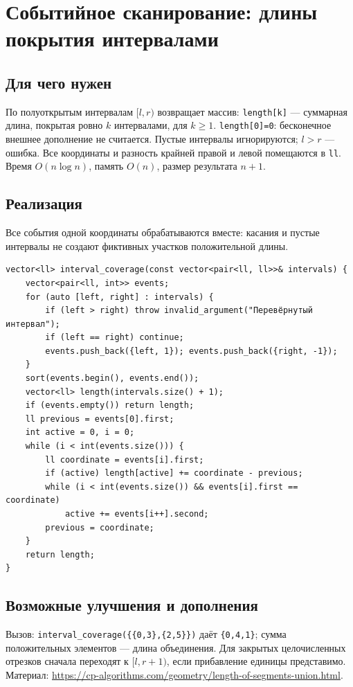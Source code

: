 \clearpage

\fi
\iffalse
\section{Событийное сканирование: длины покрытия интервалами}
\subsection*{Для чего нужен}
По полуоткрытым интервалам $[l,r)$ возвращает массив:
\texttt{length[k]} --- суммарная длина, покрытая ровно $k$ интервалами,
для $k\ge1$. \texttt{length[0]=0}: бесконечное внешнее дополнение не считается.
Пустые интервалы игнорируются; $l>r$ --- ошибка.
Все координаты и разность крайней правой и левой помещаются в \texttt{ll}.
Время $O(n\log n)$, память $O(n)$, размер результата $n+1$.
\subsection*{Реализация}
Все события одной координаты обрабатываются вместе: касания и пустые
интервалы не создают фиктивных участков положительной длины.
\begin{lstlisting}[name=supplement_sweep]
vector<ll> interval_coverage(const vector<pair<ll, ll>>& intervals) {
    vector<pair<ll, int>> events;
    for (auto [left, right] : intervals) {
        if (left > right) throw invalid_argument("Перевёрнутый интервал");
        if (left == right) continue;
        events.push_back({left, 1}); events.push_back({right, -1});
    }
    sort(events.begin(), events.end());
    vector<ll> length(intervals.size() + 1);
    if (events.empty()) return length;
    ll previous = events[0].first;
    int active = 0, i = 0;
    while (i < int(events.size())) {
        ll coordinate = events[i].first;
        if (active) length[active] += coordinate - previous;
        while (i < int(events.size()) && events[i].first == coordinate)
            active += events[i++].second;
        previous = coordinate;
    }
    return length;
}
\end{lstlisting}
\subsection*{Возможные улучшения и дополнения}
Вызов: \texttt{interval\_coverage(\{\{0,3\},\{2,5\}\})} даёт
\texttt{\{0,4,1\}}; сумма положительных элементов --- длина объединения.
Для закрытых целочисленных отрезков сначала переходят к $[l,r+1)$,
если прибавление единицы представимо.
Материал: \url{https://cp-algorithms.com/geometry/length-of-segments-union.html}.

